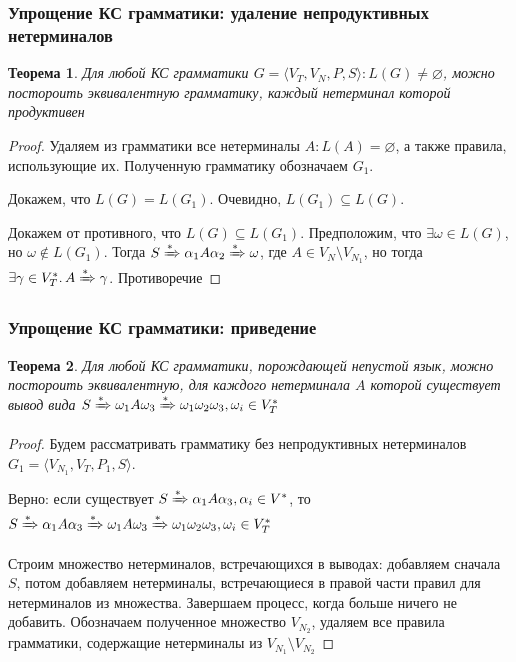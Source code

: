 \documentclass{beamer}
\newtheorem{rutheorem}{Теорема}
\newcommand{\derive}[0]{\xRightarrow[]{*}}
\begin{document}
\begin{frame}[fragile]
  \transwipe[direction=90]
  \frametitle{Упрощение КС грамматики: удаление непродуктивных нетерминалов}

  \begin{rutheorem}
    Для любой КС грамматики $G = \langle V_T, V_N, P, S\rangle: L(G) \neq \varnothing$, можно постороить эквивалентную грамматику, каждый нетерминал которой продуктивен
  \end{rutheorem}

   \begin{proof}
   Удаляем из грамматики все нетерминалы $A: L(A) = \varnothing$, а также правила, использующие их. Полученную грамматику обозначаем $G_1$.

   Докажем, что $L(G) = L(G_1)$. Очевидно, $L(G_1) \subseteq L(G)$.

   Докажем от противного, что $L(G) \subseteq L(G_1)$. Предположим, что $\exists \omega \in L(G)$, но $\omega \notin L(G_1)$. 
   Тогда $S \xRightarrow[]{*} \alpha_1 A \alpha_2 \xRightarrow[]{*} \omega$, где $A \in V_N \setminus V_{N_1}$, но тогда $\exists \gamma \in V_T^*. \, A \xRightarrow[]{*} \gamma $. Противоречие
   \end{proof}
\end{frame}

\begin{frame}[fragile]
  \transwipe[direction=90]
  \frametitle{Упрощение КС грамматики: приведение}

  \begin{rutheorem}
    Для любой КС грамматики, порождающей непустой язык, можно постороить эквивалентную, для каждого нетерминала $A$ которой существует вывод вида $S \derive \omega_1 A \omega_3 \derive \omega_1 \omega_2 \omega_3, \omega_i \in V_T^*$
  \end{rutheorem}

   \begin{proof}
   Будем рассматривать грамматику без непродуктивных нетерминалов $G_1 = \langle V_{N_1}, V_T, P_1, S\rangle$.
   
   Верно: если существует $S \derive \alpha_1 A \alpha_3, \alpha_i \in V^*$, то $S \derive \alpha_1 A \alpha_3 \derive \omega_1 A \omega_3 \derive \omega_1 \omega_2 \omega_3, \omega_i \in V_T^*$
   
   Строим множество нетерминалов, встречающихся в выводах: добавляем сначала $S$, потом добавляем нетерминалы, встречающиеся в правой части правил для нетерминалов из множества. Завершаем процесс, когда больше ничего не добавить. Обозначаем полученное множество $V_{N_2}$, удаляем все правила грамматики, содержащие нетерминалы из $ V_{N_1} \setminus V_{N_2}$
   
   
   \end{proof}
\end{frame}
\end{document}
